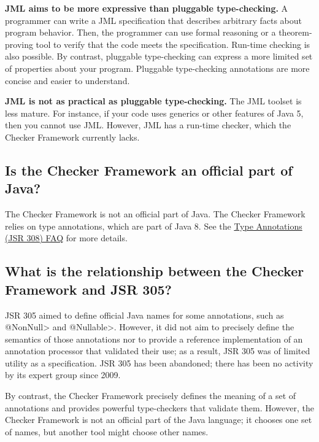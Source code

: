 \textbf{JML aims to be more expressive than pluggable type-checking.}
A programmer can write a JML specification that
describes arbitrary facts about program behavior.  Then, the programmer can
use formal reasoning or a theorem-proving tool to verify that the code
meets the specification.  Run-time checking is also possible.
By contrast, pluggable type-checking can express a more limited set of
properties about your program.  Pluggable type-checking annotations are
more concise and easier to understand.

\textbf{JML is not as practical as pluggable type-checking.}
The JML toolset is less mature.  For instance, if your code uses
generics or other features of Java 5, then you cannot use JML.
However, JML has a run-time checker, which the Checker Framework currently
lacks.


\subsection{Is the Checker Framework an official part of Java?\label{faq-checker-framework-part-of-java}}

The Checker Framework is not an official part of Java.
The Checker Framework relies on
type annotations, which are part of Java 8.  See the
\href{https://checkerframework.org/jsr308/jsr308-faq.html#pluggable-type-checking-in-java}{Type
  Annotations (JSR 308) FAQ} for more details.


\subsection{What is the relationship between the Checker Framework and JSR 305?\label{faq-jsr-305}}

JSR 305 aimed to define official Java names for some annotations, such as
\<@NonNull> and \<@Nullable>.  However, it did not aim to precisely define
the semantics of those annotations nor to provide a reference
implementation of an annotation processor that validated their use;
as a result, JSR 305 was of limited utility as a specification.
JSR 305 has been abandoned; there has been
no activity by its expert group since
2009.

By contrast, the Checker Framework precisely defines the meaning of a set
of annotations and provides powerful type-checkers that validate them.
However, the Checker Framework is not an official part of the Java
language; it chooses one set of names, but another tool might choose other
names.

